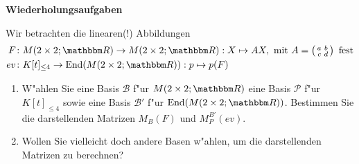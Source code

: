 \documentclass[a4,11pt]{article}
\DeclareMathOperator{\End}{End}
\begin{document}
\newpage
\bigskip
{\Large \bfseries Wiederholungsaufgaben}
\bigskip

\begin{aufgabe}
  Wir betrachten die linearen(!) Abbildungen 
  \begin{align*}
  F &\colon M(2 \times 2; \R) \to M(2 \times 2; \R) : X \mapsto AX, \ \text{mit} \ 
  A =
  \left( \begin{smallmatrix}a&b\\c&d\end{smallmatrix}\right) \ \text{fest}\\
  ev &\colon K[t]_{\le 4} \to \End(M(2 \times 2; \R)) : p \mapsto
  p(F)
  \end{align*}
  
  \begin{enumerate}
  \item
    W"ahlen Sie eine Basis $\mathcal{B}$ f"ur $M(2 \times 2; \R)$
    eine Basis $\mathcal{P}$ f"ur $K[t]_{\leq 4}$ sowie eine Basis
    $\mathcal{B'}$ f"ur %
    $\End(M(2 \times 2; \R))$.
    Bestimmen Sie die darstellenden Matrizen $M_B(F)$ und $M_P^{B'}(ev)$.
  \item
    Wollen Sie vielleicht doch andere Basen w"ahlen, um die
    darstellenden Matrizen zu berechnen?
  \end{enumerate}
\end{aufgabe}
\end{document}
